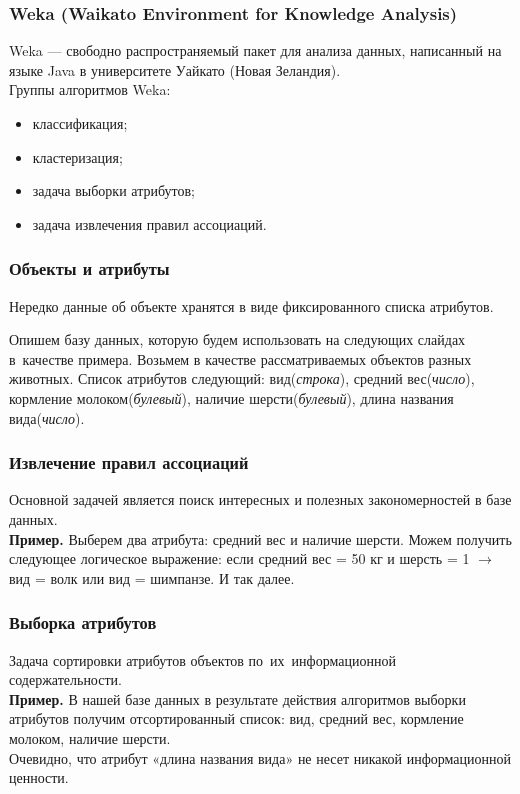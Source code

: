 \documentclass{beamer}
\begin{document}
\begin{frame}
\frametitle{Weka (Waikato Environment for Knowledge Analysis)}

Weka --- свободно распространяемый пакет для анализа данных,
написанный на языке Java в университете Уайкато (Новая Зеландия). \\
\vspace{0.3cm}
Группы алгоритмов Weka:
\begin{itemize}
\item{классификация;}
\item{кластеризация;}
\item{задача выборки атрибутов;}
\item{задача извлечения правил ассоциаций.}
\end{itemize}

\end{frame}

\begin{frame}
\frametitle{Объекты и атрибуты}
Нередко данные  об объекте хранятся в виде фиксированного списка атрибутов.

\vspace{0.5cm}

Опишем базу данных, которую будем использовать на следующих слайдах в~качестве примера.
Возьмем в качестве рассматриваемых объектов разных животных.
Список атрибутов следующий:
вид(\textsl{строка}), средний вес(\textsl{число}), кормление молоком(\textsl{булевый}), наличие шерсти(\textsl{булевый}), длина названия вида(\textsl{число}).
\end{frame}

\begin{frame}
\frametitle{Извлечение правил ассоциаций}

Основной задачей является поиск интересных и полезных закономерностей в базе данных.\\
\vspace{0.5cm}
{\bf Пример.}
Выберем два атрибута: средний вес и наличие шерсти.
Можем получить следующее логическое выражение: 
если средний вес = 50 кг и шерсть = 1  $\to$ вид = волк или вид = шимпанзе.
И так далее.

\end{frame}

\begin{frame}
\frametitle{Выборка атрибутов}
Задача сортировки атрибутов объектов по~их~информационной содержательности.\\

\vspace{0.5cm}
{\bf Пример.}
В нашей базе данных в результате действия алгоритмов выборки атрибутов получим отсортированный список: вид, средний вес, кормление молоком, наличие шерсти.\\
Очевидно, что атрибут «длина названия вида» не несет никакой информационной ценности.
\end{frame}
\end{document}
